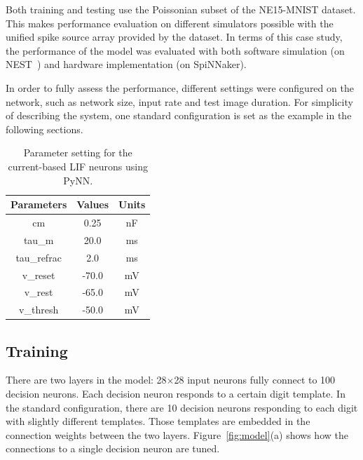 Both training and testing use the Poissonian subset of the NE15-MNIST dataset.
This makes performance evaluation on different simulators possible with the unified spike source array provided by the dataset. 
In terms of this case study, the performance of the model was evaluated with both software simulation (on NEST~\cite{gewaltig2007nest}) and hardware implementation (on SpiNNaker).

In order to fully assess the performance, different settings were configured on the network, such as network size, input rate and test image duration.
For simplicity of describing the system, one standard configuration is set as the example in the following sections.

\begin{table}[hbbp]
	\centering
	\caption{\label{tbl:pynnSetting}Parameter setting for the current-based LIF neurons using PyNN.}
	\bgroup
	\def\arraystretch{1.4}
	\begin{tabular}{c c c}
		Parameters & Values & Units \\
		\hline
		cm & 0.25 & nF	\\
		tau\_m & 20.0 & ms\\
		tau\_refrac & 2.0 & ms\\
		v\_reset & -70.0 & mV\\
		v\_rest & -65.0 & mV\\
		v\_thresh & -50.0 & mV\\
	\end{tabular}
	\egroup
\end{table}

\subsection{Training}
There are two layers in the model: 28$\times$28 input neurons fully connect to 100 decision neurons.
Each decision neuron responds to a certain digit template.
In the standard configuration, there are 10 decision neurons responding to each digit with slightly different templates.
Those templates are embedded in the connection weights between the two layers.
Figure~\ref{fig:model}(a) shows how the connections to a single decision neuron are tuned.

